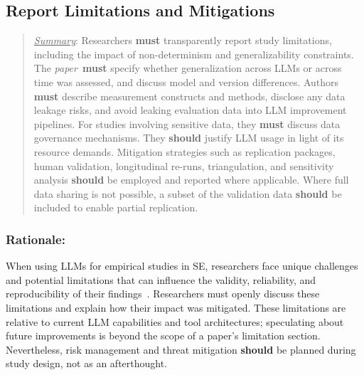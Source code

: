 \documentclass[smallextended]{svjour3}
\newcommand{\must}{\textbf{must}\xspace}
\newcommand{\should}{\textbf{should}\xspace}
\newcommand{\summary}{\underline{\emph{Summary}}\xspace}
\newcommand{\summary}{\textbf{\emph{Summary}}\xspace}
\newcommand{\paper}{\emph{paper}\xspace}
\newcommand{\paper}{\emph{paper}\xspace}
\newenvironment{framed}{\begin{quote}}{\end{quote}}
\newcommand{\guidelinesubsubsection}[1]{\subsubsection{\bfseries #1:}}
\newcommand{\guidelinesubsubsection}[1]{\subsubsection{#1}}
\begin{document}
\subsection{Report Limitations and Mitigations}
\label{sec:report-limitations-and-mitigations}

\vspace{0.5\baselineskip}
\begin{framed}
\summary: Researchers \must transparently report study limitations, including the impact of non-determinism and generalizability constraints. The \paper~\must specify whether generalization across LLMs or across time was assessed, and discuss model and version differences. Authors \must describe measurement constructs and methods, disclose any data leakage risks, and avoid leaking evaluation data into LLM improvement pipelines. For studies involving sensitive data, they \must discuss data governance mechanisms. They \should justify LLM usage in light of its resource demands. Mitigation strategies such as replication packages, human validation, longitudinal re-runs, triangulation, and sensitivity analysis \should be employed and reported where applicable. Where full data sharing is not possible, a subset of the validation data \should be included to enable partial replication. \end{framed}

\guidelinesubsubsection{Rationale}

When using LLMs for empirical studies in SE, researchers face unique challenges and potential limitations that can influence the validity, reliability, and reproducibility of their findings~\cite{DBLP:conf/icse/SallouDP24}.
Researchers must openly discuss these limitations and explain how their impact was mitigated.
These limitations are relative to current LLM capabilities and tool architectures; speculating about future improvements is beyond the scope of a paper's limitation section.
Nevertheless, risk management and threat mitigation \should be planned during study design, not as an afterthought.
\end{document}

